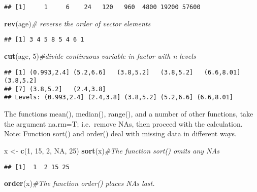 \documentclass[]{book}
\newenvironment{Shaded}{\begin{snugshade}}{\end{snugshade}}
\newcommand{\KeywordTok}[1]{\textcolor[rgb]{0.13,0.29,0.53}{\textbf{#1}}}
\newcommand{\DecValTok}[1]{\textcolor[rgb]{0.00,0.00,0.81}{#1}}
\newcommand{\StringTok}[1]{\textcolor[rgb]{0.31,0.60,0.02}{#1}}
\newcommand{\CommentTok}[1]{\textcolor[rgb]{0.56,0.35,0.01}{\textit{#1}}}
\newcommand{\OtherTok}[1]{\textcolor[rgb]{0.56,0.35,0.01}{#1}}
\newcommand{\NormalTok}[1]{#1}
\theoremstyle{definition}
\theoremstyle{definition}
\theoremstyle{definition}
\theoremstyle{remark}
\begin{document}
\begin{verbatim}
## [1]     1     6    24   120   960  4800 19200 57600
\end{verbatim}

\begin{Shaded}
\begin{Highlighting}[]
\KeywordTok{rev}\NormalTok{(age)}\CommentTok{# reverse the order of vector elements}
\end{Highlighting}
\end{Shaded}

\begin{verbatim}
## [1] 3 4 5 8 5 4 6 1
\end{verbatim}

\begin{Shaded}
\begin{Highlighting}[]
\KeywordTok{cut}\NormalTok{(age, }\DecValTok{5}\NormalTok{)}\CommentTok{#divide continuous variable in factor with n levels }
\end{Highlighting}
\end{Shaded}

\begin{verbatim}
## [1] (0.993,2.4] (5.2,6.6]   (3.8,5.2]   (3.8,5.2]   (6.6,8.01]  (3.8,5.2]  
## [7] (3.8,5.2]   (2.4,3.8]  
## Levels: (0.993,2.4] (2.4,3.8] (3.8,5.2] (5.2,6.6] (6.6,8.01]
\end{verbatim}

The functions mean(), median(), range(), and a number of other
functions, take the argument na.rm=T; i.e.~remove NAs, then proceed with
the calculation. Note: Function sort() and order() deal with missing
data in different ways.

\begin{Shaded}
\begin{Highlighting}[]
\NormalTok{x <-}\StringTok{ }\KeywordTok{c}\NormalTok{(}\DecValTok{1}\NormalTok{, }\DecValTok{15}\NormalTok{, }\DecValTok{2}\NormalTok{, }\OtherTok{NA}\NormalTok{, }\DecValTok{25}\NormalTok{)}
\KeywordTok{sort}\NormalTok{(x)}\CommentTok{#The function sort() omits any NAs}
\end{Highlighting}
\end{Shaded}

\begin{verbatim}
## [1]  1  2 15 25
\end{verbatim}

\begin{Shaded}
\begin{Highlighting}[]
\KeywordTok{order}\NormalTok{(x)}\CommentTok{#The function order() places NAs last. }
\end{Highlighting}
\end{Shaded}
\end{document}
